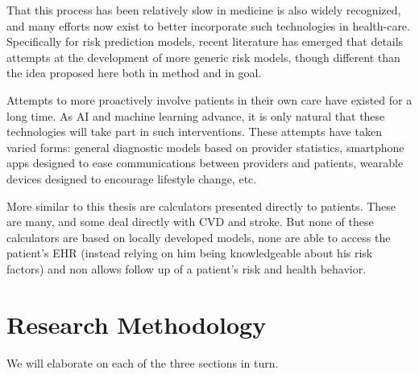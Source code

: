\documentclass[a4paper,12pt]{article}
\begin{document}
	That this process has been relatively slow in medicine is also widely recognized, and many efforts now exist to better incorporate such technologies in health-care\cite{Obermeyer2016}. Specifically for risk prediction models, recent literature has emerged that details attempts at the development of more generic risk models, though different than the idea proposed here both in method and in goal\cite{Rajkomar2018}.
	
	Attempts to more proactively involve patients in their own care have existed for a long time\cite{MedicineUSCommitteeonQualityofHealthCareinAmerica2001}. As AI and machine learning advance, it is only natural that these technologies will take part in such interventions. These attempts have taken varied forms: general diagnostic models based on provider statistics\cite{Aurbach2018}, smartphone apps designed to ease communications between providers and patients\cite{Sundberg2017}, wearable devices designed to encourage lifestyle change\cite{Gordon2017}, etc.
	
	More similar to this thesis are calculators presented directly to patients. These are many, and some deal directly with CVD and stroke\cite{Parmar2015}. But none of these calculators are based on locally developed models, none are able to access the patient's EHR (instead relying on him being knowledgeable about his risk factors) and non allows follow up of a patient's risk and health behavior.
	
	\section{Research Methodology}
	We will elaborate on each of the three sections in turn.
	
\end{document}
